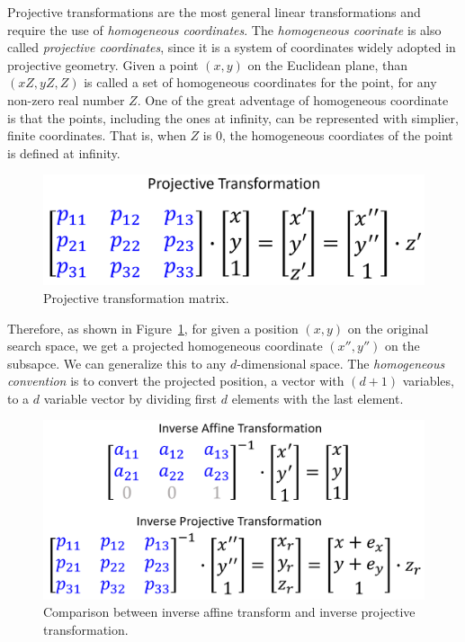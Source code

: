 Projective transformations are the most general linear transformations and require the use of \textit{homogeneous coordinates}.
The \textit{homogeneous coorinate} is also called \textit{projective coordinates}, 
since it is a system of coordinates widely adopted in projective geometry.
Given a point $(x,y)$ on the Euclidean plane, 
than $(xZ, yZ, Z)$ is called a set of homogeneous coordinates for the point, for any non-zero real number $Z$.
One of the great adventage of homogeneous coordinate is that the points, 
including the ones at infinity, can be represented with simplier, finite coordinates.
That is, when $Z$ is $0$, the homogeneous coordiates of the point is defined at infinity.

\begin{figure}
\centering
\includegraphics[width=\textwidth]{Projective_matrix}
\caption{Projective transformation matrix.}\label{fig:Projective_matrix}
\end{figure} 

Therefore, as shown in Figure~\ref{fig:Projective_matrix},
for given a position $(x,y)$ on the original search space, 
we get a projected homogeneous coordinate $(x'', y'')$ on the subsapce.  
We can generalize this to any $d$-dimensional space.
The \textit{homogeneous convention} is to convert the projected position, a vector with $(d+1)$ variables, to a $d$ variable vector 
by dividing first $d$ elements with the last element.

\begin{figure}
\centering
\includegraphics[width=\textwidth]{Inverse_transform}
\caption{Comparison between inverse affine transform and inverse projective transformation.}\label{fig:Inverse_transform}
\end{figure} 

